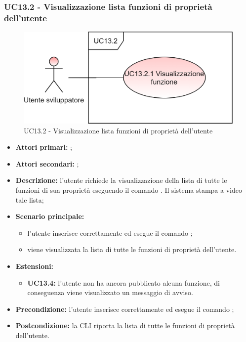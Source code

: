 \subsubsection{UC13.2 - Visualizzazione lista funzioni di proprietà dell’utente}
\begin{figure}[h]
	\centering
	\includegraphics[scale=\ucs]{./res/img/UC13-2.png}
	\caption {UC13.2 - Visualizzazione lista funzioni di proprietà dell’utente}
\end{figure}
\begin{itemize}
	\item \textbf{Attori primari:} \us{};
	\item \textbf{Attori secondari:} \re{};
	\item \textbf{Descrizione:} l’utente richiede la visualizzazione della lista di tutte le funzioni di sua proprietà eseguendo il comando \plista{}. Il sistema stampa a video tale lista;
	\item \textbf{Scenario principale:} 
	\begin{itemize}
		\item l’utente inserisce correttamente ed esegue il comando \plista{};
		\item viene visualizzata la lista di tutte le funzioni di proprietà dell’utente. 
	\end{itemize}
	\item \textbf{Estensioni:} 
	\begin{itemize}
		\item \textbf{UC13.4:} l’utente non ha ancora pubblicato alcuna funzione, di conseguenza viene visualizzato un messaggio di avviso. 
	\end{itemize}
	\item \textbf{Precondizione:} l'utente inserisce correttamente ed esegue il comando \plista{};
	\item \textbf{Postcondizione:} la CLI riporta la lista di tutte le funzioni di proprietà dell’utente. 
\end{itemize}